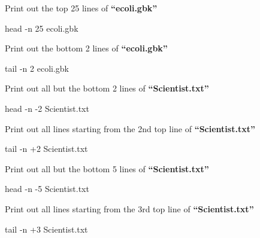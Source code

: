 \documentclass[
  letterpaper,
  DIV=11,
  numbers=noendperiod]{scrreprt}
\newenvironment{Shaded}{\begin{snugshade}}{\end{snugshade}}
\newcommand{\AttributeTok}[1]{\textcolor[rgb]{0.40,0.45,0.13}{#1}}
\newcommand{\FunctionTok}[1]{\textcolor[rgb]{0.28,0.35,0.67}{#1}}
\newcommand{\NormalTok}[1]{\textcolor[rgb]{0.00,0.23,0.31}{#1}}
\begin{document}
Print out the top 25 lines of \textbf{``ecoli.gbk''}

\begin{Shaded}
\begin{Highlighting}[]
\FunctionTok{head} \AttributeTok{{-}n}\NormalTok{ 25 ecoli.gbk}
\end{Highlighting}
\end{Shaded}

Print out the bottom 2 lines of \textbf{``ecoli.gbk''}

\begin{Shaded}
\begin{Highlighting}[]
\FunctionTok{tail} \AttributeTok{{-}n}\NormalTok{ 2 ecoli.gbk}
\end{Highlighting}
\end{Shaded}

Print out all but the bottom 2 lines of \textbf{``Scientist.txt''}

\begin{Shaded}
\begin{Highlighting}[]
\FunctionTok{head} \AttributeTok{{-}n} \AttributeTok{{-}2}\NormalTok{ Scientist.txt}
\end{Highlighting}
\end{Shaded}

Print out all lines starting from the 2nd top line of
\textbf{``Scientist.txt''}

\begin{Shaded}
\begin{Highlighting}[]
\FunctionTok{tail} \AttributeTok{{-}n}\NormalTok{ +2 Scientist.txt}
\end{Highlighting}
\end{Shaded}

Print out all but the bottom 5 lines of \textbf{``Scientist.txt''}

\begin{Shaded}
\begin{Highlighting}[]
\FunctionTok{head} \AttributeTok{{-}n} \AttributeTok{{-}5}\NormalTok{ Scientist.txt}
\end{Highlighting}
\end{Shaded}

Print out all lines starting from the 3rd top line of
\textbf{``Scientist.txt''}

\begin{Shaded}
\begin{Highlighting}[]
\FunctionTok{tail} \AttributeTok{{-}n}\NormalTok{ +3 Scientist.txt}
\end{Highlighting}
\end{Shaded}
\end{document}
